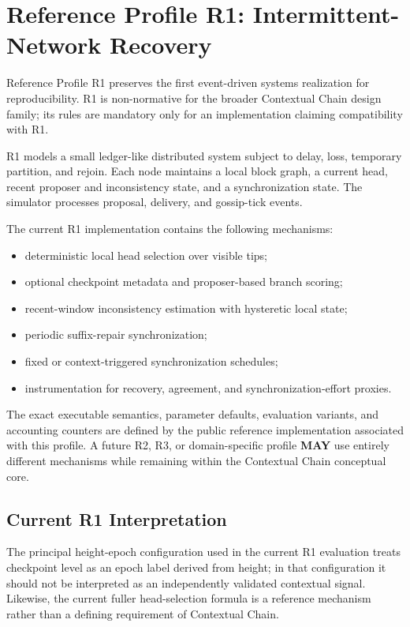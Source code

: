 \documentclass[11pt]{article}
\begin{document}
\section{Reference Profile R1: Intermittent-Network Recovery}
Reference Profile R1 preserves the first event-driven systems realization for reproducibility.
R1 is non-normative for the broader Contextual Chain design family; its rules are mandatory only
for an implementation claiming compatibility with R1.

R1 models a small ledger-like distributed system subject to delay, loss, temporary partition,
and rejoin. Each node maintains a local block graph, a current head, recent proposer and
inconsistency state, and a synchronization state. The simulator processes proposal, delivery,
and gossip-tick events.

The current R1 implementation contains the following mechanisms:
\begin{itemize}
  \item deterministic local head selection over visible tips;
  \item optional checkpoint metadata and proposer-based branch scoring;
  \item recent-window inconsistency estimation with hysteretic local state;
  \item periodic suffix-repair synchronization;
  \item fixed or context-triggered synchronization schedules;
  \item instrumentation for recovery, agreement, and synchronization-effort proxies.
\end{itemize}

The exact executable semantics, parameter defaults, evaluation variants, and accounting counters
are defined by the public reference implementation associated with this profile. A future R2,
R3, or domain-specific profile \textbf{MAY} use entirely different mechanisms while remaining
within the Contextual Chain conceptual core.

\subsection{Current R1 Interpretation}
The principal height-epoch configuration used in the current R1 evaluation treats checkpoint
level as an epoch label derived from height; in that configuration it should not be interpreted as
an independently validated contextual signal. Likewise, the current fuller head-selection formula
is a reference mechanism rather than a defining requirement of Contextual Chain.
\end{document}
